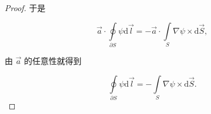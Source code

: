 \begin{proof}
于是

\begin{equation}
\vec{a} \cdot \oint\limits_{\partial S} \psi \mathrm{d}\vec{l}
=-\vec{a} \cdot \int\limits_{S} \nabla \psi \times \mathrm{d}\vec{S},
\end{equation}

由 $\vec{a} $ 的任意性就得到

\begin{equation}
\oint\limits_{\partial S} \psi \mathrm{d}\vec{l}
=-\int\limits_{S} \nabla \psi \times \mathrm{d}\vec{S}.
\end{equation}

\end{proof}



